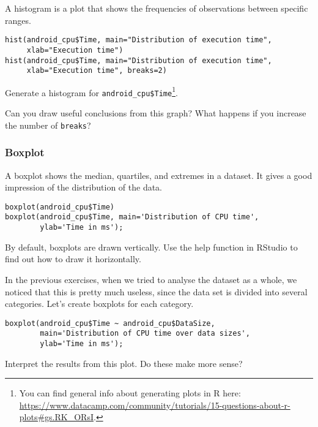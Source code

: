 A histogram is a plot that shows the frequencies of observations between specific ranges.

\begin{lstlisting}
hist(android_cpu$Time, main="Distribution of execution time",
     xlab="Execution time")
hist(android_cpu$Time, main="Distribution of execution time",
     xlab="Execution time", breaks=2)
\end{lstlisting}

\begin{exercise}
Generate a histogram for \texttt{android\_cpu\$Time}\footnote{You can find general info about generating plots in R here:  \url{https://www.datacamp.com/community/tutorials/15-questions-about-r-plots\#gs.RK_ORsI}.}.
 
Can you draw useful conclusions from this graph? What happens if you increase the number of \texttt{breaks}?
\end{exercise}

\subsubsection{Boxplot}

A boxplot shows the median, quartiles, and extremes in a dataset. It gives a good impression of the distribution of the data.

\begin{lstlisting}
boxplot(android_cpu$Time)
boxplot(android_cpu$Time, main='Distribution of CPU time',
        ylab='Time in ms');
\end{lstlisting} 

\begin{exercise}
  By default, boxplots are drawn vertically. Use the help function in RStudio to find out how to draw it horizontally.
\end{exercise}

In the previous exercises, when we tried to analyse the dataset as a whole, we noticed that this is pretty much useless, since the data set is divided into several categories. Let's create boxplots for each category.

\begin{lstlisting}
boxplot(android_cpu$Time ~ android_cpu$DataSize,
        main='Distribution of CPU time over data sizes',
        ylab='Time in ms');
\end{lstlisting}

\begin{exercise}
\label{ex:boxplot}
Interpret the results from this plot. Do these make more sense?
\end{exercise}

